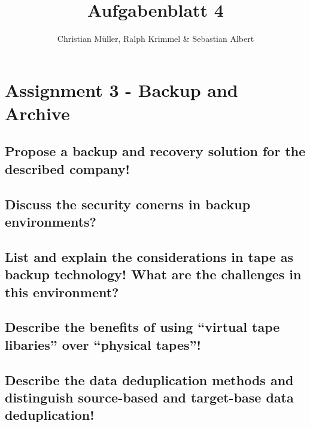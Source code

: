 \documentclass{article}
\title{Aufgabenblatt 4}
\author{Christian Müller, Ralph Krimmel \& Sebastian Albert }
\begin{document}
\maketitle

\section*{Assignment 3 - Backup and Archive}

\subsection{Propose a backup and recovery solution for the described company!}

\subsection{Discuss the security conerns in backup environments?}

\subsection{List and explain the considerations in tape as backup technology!
				What are the challenges in this environment?}

\subsection{Describe the benefits of using ``virtual tape libaries'' over ``physical tapes''!}

\subsection{Describe the data deduplication methods and distinguish source-based and target-base data deduplication!}
\end{document}
